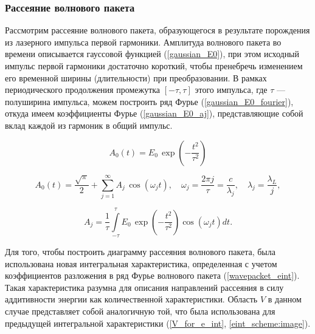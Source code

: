 \subsubsection{Рассеяние волнового пакета}

Рассмотрим рассеяние волнового пакета, образующегося в результате порождения из лазерного импульса первой гармоники. Амплитуда волнового пакета во времени описывается гауссовой функцией (\ref{gaussian_E0}), при этом исходный импульс первой гармоники достаточно короткий, чтобы пренебречь изменением его временной ширины (длительности) при преобразовании. В рамках периодического продолжения промежутка $[-\tau, \tau]$ этого импульса, где $\tau$ --- полуширина импульса, можем построить ряд Фурье (\ref{gaussian_E0_fourier}), откуда имеем коэффициенты Фурье (\ref{gaussian_E0_aj}), представляющие собой вклад каждой из гармоник в общий импульс.

    \begin{equation}
        A_0\left( t \right) = E_0\,\exp{\left( - \frac{t^2}{\tau^2}\right)}
        \label{gaussian_E0}
    \end{equation}

    \begin{equation}
        A_0\left( t \right) = \frac{\sqrt{\pi}}{2} + \sum_{j = 1}^{\infty}{ A_j \, \cos{\left(\omega_j t \right)}}, \quad \omega_j = \frac{2 \pi j}{\tau} = \frac{c}{\lambda_j}, \quad \lambda_{j} = \frac{\lambda_{L}}{j},
        \label{gaussian_E0_fourier}
    \end{equation}

    \begin{equation}
        A_j = \frac{1}{\tau} \int\limits_{-\tau}^{\tau} E_0\,\exp{\left( - \frac{t^2}{\tau^2}\right)} \cos{\left(\omega_j t \right)} dt.
        \label{gaussian_E0_aj}
    \end{equation}

Для того, чтобы построить диаграмму рассеяния волнового пакета, была использована новая интегральная характеристика, определенная с учетом коэффициентов разложения в ряд Фурье волнового пакета (\ref{wavepacket_eint}). Такая характеристика разумна для описания направлений рассеяния в силу аддитивности энергии как количественной характеристики. Область $V$ в данном случае представляет собой аналогичную той, что была использована для предыдущей интегральной характеристики (\ref{V_for_e_int}, \autoref{eint_scheme:image}).


